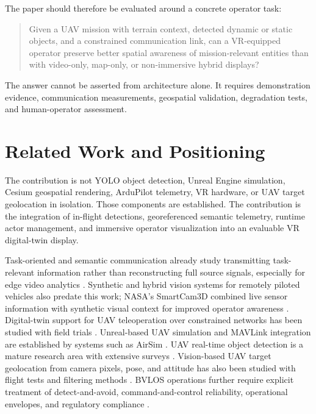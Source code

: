 \documentclass[11pt,a4paper]{article}
\begin{document}
The paper should therefore be evaluated around a concrete operator task:

\begin{quote}
Given a UAV mission with terrain context, detected dynamic or static objects, and a constrained communication link, can a VR-equipped operator preserve better spatial awareness of mission-relevant entities than with video-only, map-only, or non-immersive hybrid displays?
\end{quote}

The answer cannot be asserted from architecture alone. It requires demonstration evidence, communication measurements, geospatial validation, degradation tests, and human-operator assessment.

\section{Related Work and Positioning}

The contribution is not YOLO object detection, Unreal Engine simulation, Cesium geospatial rendering, ArduPilot telemetry, VR hardware, or UAV target geolocation in isolation. Those components are established. The contribution is the integration of in-flight detections, georeferenced semantic telemetry, runtime actor management, and immersive operator visualization into an evaluable VR digital-twin display.

Task-oriented and semantic communication already study transmitting task-relevant information rather than reconstructing full source signals, especially for edge video analytics \cite{shao2022task}. Synthetic and hybrid vision systems for remotely piloted vehicles also predate this work; NASA's SmartCam3D combined live sensor information with synthetic visual context for improved operator awareness \cite{nasa2005smartcam}. Digital-twin support for UAV teleoperation over constrained networks has been studied with field trials \cite{sehad2023digitaltwin}. Unreal-based UAV simulation and MAVLink integration are established by systems such as AirSim \cite{shah2017airsim}. UAV real-time object detection is a mature research area with extensive surveys \cite{cao2023uavdetection}. Vision-based UAV target geolocation from camera pixels, pose, and attitude has also been studied with flight tests and filtering methods \cite{barber2006geolocation,isprs2016geolocation}. BVLOS operations further require explicit treatment of detect-and-avoid, command-and-control reliability, operational envelopes, and regulatory compliance \cite{faa2025bvlos}.
\end{document}

